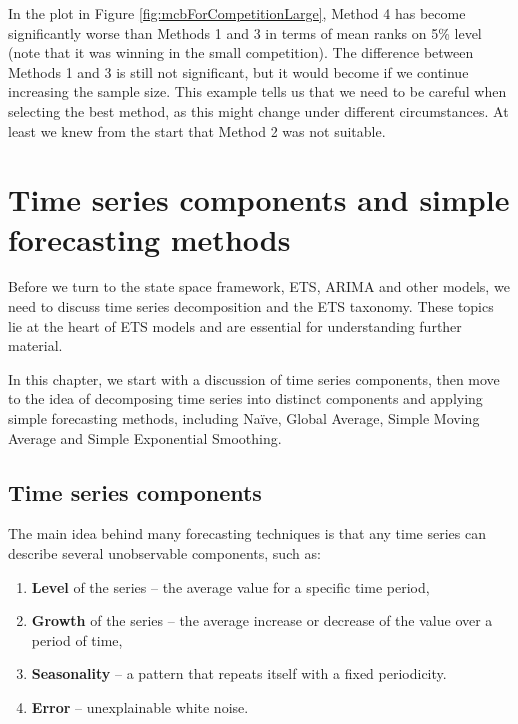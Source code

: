 \documentclass[
]{book}
\providecommand{\tightlist}{%
  \setlength{\itemsep}{0pt}\setlength{\parskip}{0pt}}
\theoremstyle{definition}
\theoremstyle{definition}
\theoremstyle{definition}
\theoremstyle{definition}
\theoremstyle{remark}
\begin{document}
In the plot in Figure \ref{fig:mcbForCompetitionLarge}, Method 4 has become significantly worse than Methods 1 and 3 in terms of mean ranks on 5\% level (note that it was winning in the small competition). The difference between Methods 1 and 3 is still not significant, but it would become if we continue increasing the sample size. This example tells us that we need to be careful when selecting the best method, as this might change under different circumstances. At least we knew from the start that Method 2 was not suitable.

\hypertarget{tsDecomposition}{%
\chapter{Time series components and simple forecasting methods}\label{tsDecomposition}}

Before we turn to the state space framework, ETS, ARIMA and other models, we need to discuss time series decomposition and the ETS taxonomy. These topics lie at the heart of ETS models and are essential for understanding further material.

In this chapter, we start with a discussion of time series components, then move to the idea of decomposing time series into distinct components and applying simple forecasting methods, including Naïve, Global Average, Simple Moving Average and Simple Exponential Smoothing.

\hypertarget{tsComponents}{%
\section{Time series components}\label{tsComponents}}

The main idea behind many forecasting techniques is that any time series can describe several unobservable components, such as:

\begin{enumerate}
\def\labelenumi{\arabic{enumi}.}
\tightlist
\item
  \textbf{Level} of the series -- the average value for a specific time period,
\item
  \textbf{Growth} of the series -- the average increase or decrease of the value over a period of time,
\item
  \textbf{Seasonality} -- a pattern that repeats itself with a fixed periodicity.
\item
  \textbf{Error} -- unexplainable white noise.
\end{enumerate}
\end{document}
